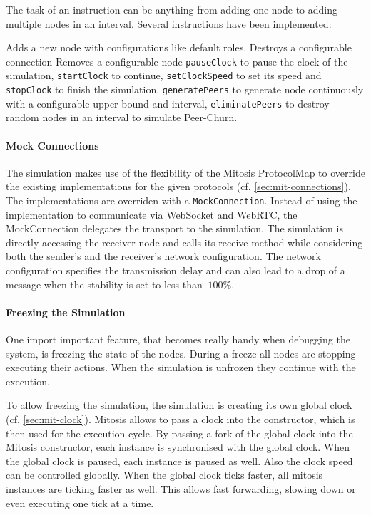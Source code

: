 The task of an instruction can be anything from adding one node to adding multiple nodes in an interval. Several instructions have been implemented:

\begin{itemize}
     Adds a new node with configurations like default roles.
      Destroys a configurable connection
     Removes a configurable node
     \lstinline|pauseClock| to pause the clock of the simulation, \lstinline|startClock| to continue, \lstinline|setClockSpeed| to set its speed and \lstinline|stopClock| to finish the simulation.
     \lstinline|generatePeers| to generate node continuously with a configurable upper bound and interval, \lstinline|eliminatePeers| to destroy random nodes in an interval to simulate Peer-Churn.
\end{itemize}

\paragraph{Mock Connections}
The simulation makes use of the flexibility of the Mitosis ProtocolMap to override the existing implementations for the given protocols (cf. \vref{sec:mit-connections}). The implementations are overriden with a  \lstinline|MockConnection|. Instead of using the implementation to communicate via WebSocket and WebRTC, the MockConnection delegates the transport to the simulation. The simulation is directly accessing the receiver node and calls its receive method while considering both the sender's and the receiver's network configuration. The network configuration specifies the transmission delay and can also lead to a drop of a message when the stability is set to less than $\ 100\% $.

\paragraph{Freezing the Simulation}
One import important feature, that becomes really handy when debugging the system, is freezing the state of the nodes. During a freeze all nodes are stopping executing their actions. When the simulation is unfrozen they continue with the execution.

To allow freezing the simulation, the simulation is creating its own global clock (cf. \vref{sec:mit-clock}). Mitosis allows to pass a clock into the constructor, which is then used for the execution cycle. By passing a fork of the global clock into the Mitosis constructor, each instance is synchronised with the global clock. When the global clock is paused, each instance is paused as well.
Also the clock speed can be controlled globally. When the global clock ticks faster, all mitosis instances are ticking faster as well. This allows fast forwarding, slowing down or even executing one tick at a time.

